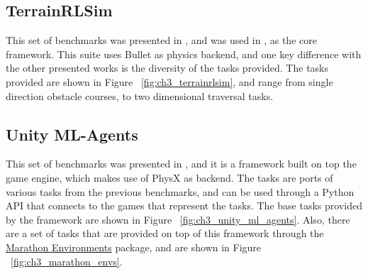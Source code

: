 \figBenchmarksGpuSim

\subsection{TerrainRLSim}

This set of benchmarks was presented in \cite{TerrainRLSim}, and was used in \cite{DeepTerrainRL}, 
\cite{ActuationChoice} as the core framework. This suite uses Bullet as physics backend,
and one key difference with the other presented works is the diversity of the tasks provided.
The tasks provided are shown in Figure ~\ref{fig:ch3_terrainrlsim}, and range from 
single direction obstacle courses, to two dimensional traversal tasks.

\figBenchmarksTerrainRLSim

\subsection{Unity ML-Agents}

This set of benchmarks was presented in \cite{UnityMLAgents}, and it is a framework 
built on top the \citeauthor{Unity} game engine, which makes use of PhysX as backend. 
The tasks are ports of various tasks from the previous benchmarks, and can be used
through a Python API that connects to the games that represent the tasks. The base tasks
provided by the framework are shown in Figure ~\ref{fig:ch3_unity_ml_agents}. Also, 
there are a set of tasks that are provided on top of this framework through the 
\href{https://github.com/Unity-Technologies/marathon-envs}{Marathon Environments} 
package, and are shown in Figure ~\ref{fig:ch3_marathon_envs}.

\figBenchmarksUnityMLAgents

\figBenchmarksMarathonEnvs